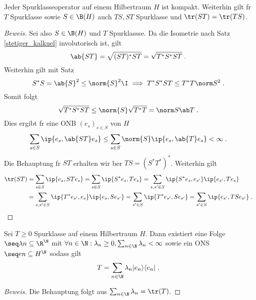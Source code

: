 \begin{theorem}
	Jeder Spurklasseoperator auf einem Hilbertraum $H$ ist kompakt. Weiterhin gilt f\us r $T$ Spurklasse sowie \(S \in \B(H)\) auch \(TS, ST\) Spurklasse und \(\tr (ST) = \tr(TS)\).
\end{theorem}
\begin{proof}[Beweis]
	Sei also \(S\in \B(H)\) und $T$ Spurklassse.  Da die Isometrie nach Satz \ref{stetiger_kalkuel} involutorisch ist, gilt
	\[\ab{ST} = \sqrt{(ST)^*ST} = \sqrt{T^*S^*ST}\;.\]
	Weiterhin gilt mit Satz 
	\[S^*S = \ab{S}^2  \leq \norm{S}^2 \I \implies T^* S^* ST \leq T^*T\norm S^2 \;.\]
	Somit folgt
	\[\sqrt{T^*S^*ST} \leq \norm{S} \sqrt{T^*T} = \norm S \ab T\;.\]	
	Dies ergibt f\us r eine ONB \((e_s)_{s\in S}\) von $H$
	\[\sum_{s\in S}\ip{e_s, \ab{ST} e_s} \leq \sum_{s\in S} \norm{S} \ip{e_s, \ab{T}e_s} < \infty\;.\]
	Die Behauptung f\us r $ST$ erhalten wir \us ber \(TS = (S^*T^*)^*\). Weiterhin gilt
	\begin{align*}\tr(ST) &= \sum_{s\in S} \ip{e_s, ST e_s} = \sum_{s\in S} \ip {S^* e_s, T e_s} = \sum_{s, s' \in S}\ip{S^* e_s, e_{s'}}\ip{e_{s'}, Te_s} \\
		&= \sum_{s, s' \in S}\ip{T^* e_{s'}, e_s}\ip{e_s, Se_{s'}} = \sum_{s'\in S} \ip{T^* e_{s'}, S e_{s'}} = \sum_{s'\in S} \ip {e_{s'}, TS e_{s'}}\;.
		\end{align*}
\end{proof}
\begin{theorem}
	Sei \(T\geq 0\) Spurklasse auf einem Hilbertraum $H$. Dann existiert eine Folge \(\seq \lambda n \subseteq \R^\N\) mit \( \forall n\in\N: \lambda_n \geq 0, \sum_{n\in\N} \lambda_n <\infty\) sowie ein ONS \(\seq en \subseteq H^\N\) sodass gilt
	\[ T = \sum_{n\in\N} \lambda_n|e_n\rangle \langle e_n|\;.\]
	\label{spurklasse_geq0_Folge}
\end{theorem}
\begin{proof}[Beweis]
	Die Behauptung folgt aus \(\sum_{n\in\N} \lambda_n = \tr(T)\).
\end{proof}